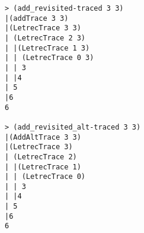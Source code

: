 \begin{verbatim}
> (add_revisited-traced 3 3)
|(addTrace 3 3)
|(LetrecTrace 3 3)
| (LetrecTrace 2 3)
| |(LetrecTrace 1 3)
| | (LetrecTrace 0 3)
| | 3
| |4
| 5
|6
6

> (add_revisited_alt-traced 3 3)
|(AddAltTrace 3 3)
|(LetrecTrace 3)
| (LetrecTrace 2)
| |(LetrecTrace 1)
| | (LetrecTrace 0)
| | 3
| |4
| 5
|6
6
\end{verbatim}